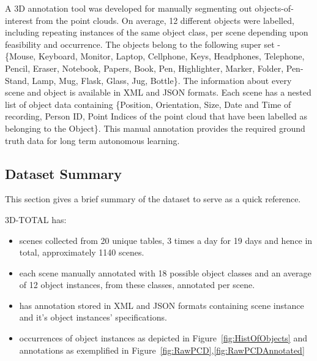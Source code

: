 \documentclass[letterpaper, 10 pt, conference]{ieeeconf}  %
\begin{document}
A 3D annotation tool was developed for manually segmenting out objects-of-interest from the point clouds. On average, 12 different objects were labelled, including repeating instances of the same object class, per scene depending upon feasibility and occurrence. The objects belong to the following super set - \{Mouse, Keyboard, Monitor, Laptop, Cellphone, Keys, Headphones, Telephone, Pencil, Eraser, Notebook, Papers,  Book, Pen, Highlighter, Marker, Folder, Pen-Stand, Lamp, Mug, Flask, Glass, Jug, Bottle\}. The information about every scene and object is available in  XML and JSON formats. Each scene has a nested list of object data containing \{Position, Orientation, Size, Date and Time of recording, Person ID, Point Indices of the point cloud that have been labelled as belonging to the Object\}. This manual annotation provides the required ground truth data for long term autonomous learning.

\subsection{Dataset Summary}
\label{ssec:Dataset Summary}
This section gives a brief summary of the dataset to serve as a quick reference.

\noindent 3D-TOTAL has:
\begin{itemize}
	\item scenes collected from 20 unique tables, 3 times a day for 19 days and hence in total, approximately 1140 scenes.
	\item each scene manually annotated with 18 possible object classes and an average of 12 object instances, from these classes, annotated per scene.
	\item has annotation stored in XML and JSON formats containing scene instance and it's object instances' specifications.
	\item occurrences of object instances as depicted in Figure~\ref{fig:HistOfObjects} and annotations as exemplified in Figure~\ref{fig:RawPCD},\ref{fig:RawPCDAnnotated}
\end{itemize}
\end{document}

